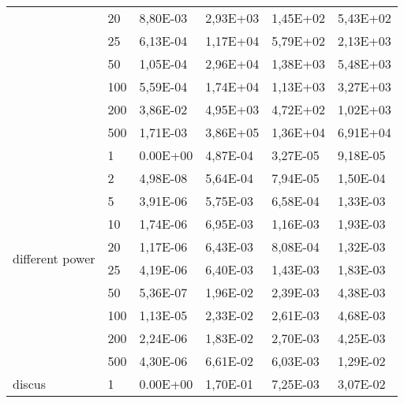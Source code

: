 \begin{longtable}[c]{|m{3.5cm}|l|l|l|l|l|}
                                        & 20        & 8,80E-03   & 2,93E+03   & 1,45E+02   & 5,43E+02  \\ \cline{2-6} 
                                        & 25        & 6,13E-04   & 1,17E+04   & 5,79E+02   & 2,13E+03  \\ \cline{2-6} 
                                        & 50        & 1,05E-04   & 2,96E+04   & 1,38E+03   & 5,48E+03  \\ \cline{2-6} 
                                        & 100       & 5,59E-04   & 1,74E+04   & 1,13E+03   & 3,27E+03  \\ \cline{2-6} 
                                        & 200       & 3,86E-02   & 4,95E+03   & 4,72E+02   & 1,02E+03  \\ \cline{2-6} 
                                        & 500       & 1,71E-03   & 3,86E+05   & 1,36E+04   & 6,91E+04  \\ \hline
\multirow{10}{*}{different power}       & 1         & 0.00E+00   & 4,87E-04   & 3,27E-05   & 9,18E-05  \\ \cline{2-6} 
                                        & 2         & 4,98E-08   & 5,64E-04   & 7,94E-05   & 1,50E-04  \\ \cline{2-6} 
                                        & 5         & 3,91E-06   & 5,75E-03   & 6,58E-04   & 1,33E-03  \\ \cline{2-6} 
                                        & 10        & 1,74E-06   & 6,95E-03   & 1,16E-03   & 1,93E-03  \\ \cline{2-6} 
                                        & 20        & 1,17E-06   & 6,43E-03   & 8,08E-04   & 1,32E-03  \\ \cline{2-6} 
                                        & 25        & 4,19E-06   & 6,40E-03   & 1,43E-03   & 1,83E-03  \\ \cline{2-6} 
                                        & 50        & 5,36E-07   & 1,96E-02   & 2,39E-03   & 4,38E-03  \\ \cline{2-6} 
                                        & 100       & 1,13E-05   & 2,33E-02   & 2,61E-03   & 4,68E-03  \\ \cline{2-6} 
                                        & 200       & 2,24E-06   & 1,83E-02   & 2,70E-03   & 4,25E-03  \\ \cline{2-6} 
                                        & 500       & 4,30E-06   & 6,61E-02   & 6,03E-03   & 1,29E-02  \\ \hline
\multirow{10}{*}{discus}                & 1         & 0.00E+00   & 1,70E-01   & 7,25E-03   & 3,07E-02  \\ \cline{2-6} 

\end{longtable}
